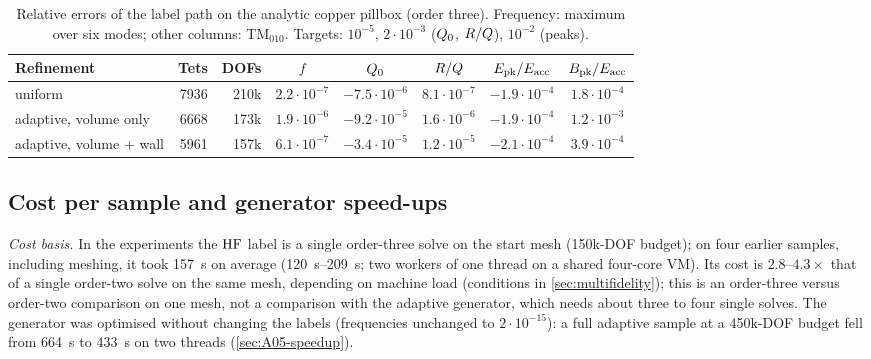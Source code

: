 \begin{table}[t]
\centering
\caption{Relative errors of the label path on the analytic copper pillbox (order three). Frequency: maximum over six modes; other columns: TM$_{010}$. Targets: $10^{-5}$, $2\cdot10^{-3}$ ($\Qz$, $R/Q$), $10^{-2}$ (peaks).}
\label{tab:05-validation}
\small
\begin{tabular}{@{}lrrccccc@{}}
\toprule
Refinement & Tets & DOFs & $f$ & $\Qz$ & $R/Q$ & $\Epk/\Eacc$ & $\Bpk/\Eacc$ \\
\midrule
uniform & 7936 & 210k & $2.2\cdot10^{-7}$ & $-7.5\cdot10^{-6}$ & $8.1\cdot10^{-7}$ & $-1.9\cdot10^{-4}$ & $1.8\cdot10^{-4}$ \\
adaptive, volume only & 6668 & 173k & $1.9\cdot10^{-6}$ & $-9.2\cdot10^{-5}$ & $1.6\cdot10^{-6}$ & $-1.9\cdot10^{-4}$ & $1.2\cdot10^{-3}$ \\
adaptive, volume + wall & 5961 & 157k & $6.1\cdot10^{-7}$ & $-3.4\cdot10^{-5}$ & $1.2\cdot10^{-5}$ & $-2.1\cdot10^{-4}$ & $3.9\cdot10^{-4}$ \\
\bottomrule
\end{tabular}
\end{table}

\subsection{Cost per sample and generator speed-ups}\label{sec:05-cost}

\emph{Cost basis.} In the experiments the $\mathrm{HF}$ label is a single order-three solve on the start mesh (150k-DOF budget); on four earlier samples, including meshing, it took \SI{157}{s} on average (\SI{120}{s}--\SI{209}{s}; two workers of one thread on a shared four-core VM).
Its cost is $2.8$--$4.3\times$ that of a single order-two solve on the same mesh, depending on machine load (conditions in \cref{sec:multifidelity}); this is an order-three versus order-two comparison on one mesh, not a comparison with the adaptive generator, which needs about three to four single solves.
The generator was optimised without changing the labels (frequencies unchanged to $2\cdot10^{-15}$): a full adaptive sample at a 450k-DOF budget fell from \SI{664}{s} to \SI{433}{s} on two threads (\cref{sec:A05-speedup}).
